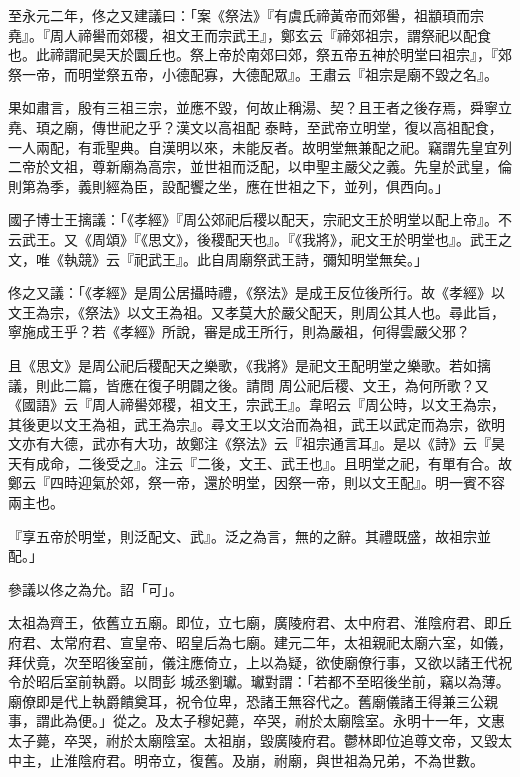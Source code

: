 \begin{pinyinscope}
 至永元二年，佟之又建議曰：「案《祭法》『有虞氏禘黃帝而郊嚳，祖顓頊而宗堯』。『周人禘嚳而郊稷，祖文王而宗武王』，鄭玄云『禘郊祖宗，謂祭祀以配食也。此禘謂祀昊天於圜丘也。祭上帝於南郊曰郊，祭五帝五神於明堂曰祖宗』，『郊祭一帝，而明堂祭五帝，小德配寡，大德配眾』。王肅云『祖宗是廟不毀之名』。



 果如肅言，殷有三祖三宗，並應不毀，何故止稱湯、契？且王者之後存焉，舜寧立堯、頊之廟，傳世祀之乎？漢文以高祖配
 泰畤，至武帝立明堂，復以高祖配食，一人兩配，有乖聖典。自漢明以來，未能反者。故明堂無兼配之祀。竊謂先皇宜列二帝於文祖，尊新廟為高宗，並世祖而泛配，以申聖主嚴父之義。先皇於武皇，倫則第為季，義則經為臣，設配饗之坐，應在世祖之下，並列，俱西向。」



 國子博士王摛議：「《孝經》『周公郊祀后稷以配天，宗祀文王於明堂以配上帝』。不云武王。又《周頌》『《思文》，後稷配天也』。『《我將》，祀文王於明堂也』。武王之文，唯《執競》云『祀武王』。此自周廟祭武王詩，彌知明堂無矣。」



 佟之又議：「《孝經》是周公居攝時禮，《祭法》是成王反位後所行。故《孝經》以文王為宗，《祭法》以文王為祖。又孝莫大於嚴父配天，則周公其人也。尋此旨，寧施成王乎？若《孝經》所說，審是成王所行，則為嚴祖，何得雲嚴父邪？



 且《思文》是周公祀后稷配天之樂歌，《我將》是祀文王配明堂之樂歌。若如摛議，則此二篇，皆應在復子明闢之後。請問
 周公祀后稷、文王，為何所歌？又《國語》云『周人禘嚳郊稷，祖文王，宗武王』。韋昭云『周公時，以文王為宗，其後更以文王為祖，武王為宗』。尋文王以文治而為祖，武王以武定而為宗，欲明文亦有大德，武亦有大功，故鄭注《祭法》云『祖宗通言耳』。是以《詩》云『昊天有成命，二後受之』。注云『二後，文王、武王也』。且明堂之祀，有單有合。故鄭云『四時迎氣於郊，祭一帝，還於明堂，因祭一帝，則以文王配』。明一賓不容兩主也。



 『享五帝於明堂，則泛配文、武』。泛之為言，無的之辭。其禮既盛，故祖宗並配。」



 參議以佟之為允。詔「可」。



 太祖為齊王，依舊立五廟。即位，立七廟，廣陵府君、太中府君、淮陰府君、即丘府君、太常府君、宣皇帝、昭皇后為七廟。建元二年，太祖親祀太廟六室，如儀，拜伏竟，次至昭後室前，儀注應倚立，上以為疑，欲使廟僚行事，又欲以諸王代祝令於昭后室前執爵。以問彭
 城丞劉瓛。瓛對謂：「若都不至昭後坐前，竊以為薄。廟僚即是代上執爵饋奠耳，祝令位卑，恐諸王無容代之。舊廟儀諸王得兼三公親事，謂此為便。」從之。及太子穆妃薨，卒哭，祔於太廟陰室。永明十一年，文惠太子薨，卒哭，祔於太廟陰室。太祖崩，毀廣陵府君。鬱林即位追尊文帝，又毀太中主，止淮陰府君。明帝立，復舊。及崩，祔廟，與世祖為兄弟，不為世數。




\end{pinyinscope}
